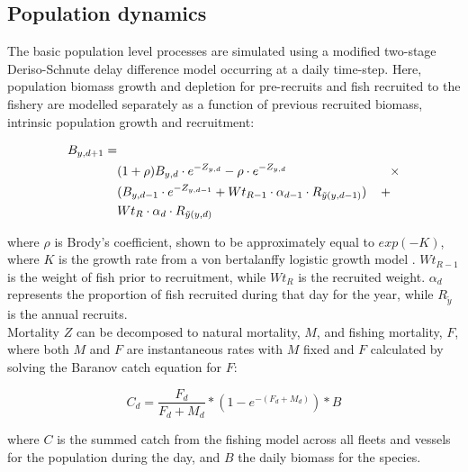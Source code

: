 \documentclass[review]{elsarticle}
\begin{document}
\subsection{Population dynamics}

The basic population level processes are simulated using a modified two-stage
Deriso-Schnute delay difference model \cite{Deriso1980, Schnute1985,
	Dichmont2003} occurring at a daily time-step. Here, population biomass
growth and depletion for pre-recruits and fish recruited to the fishery are
modelled separately as a function of previous recruited biomass, intrinsic
population growth and recruitment:

\begin{equation*}
	\begin{split}
	B_{y,d+1} = &\\
	& (1 + \rho) B_{y,d} \cdot e^{-Z_{y,d}} - \rho \cdot e^{-Z_{y,d}} \hspace{2.9cm}
	\times \\  
	& (B_{y,d-1} \cdot e^{-Z_{y,d-1}} + Wt_{R-1} \cdot \alpha_{d-1} \cdot R_{\tilde{y}(y,d-1)})
	\hspace{0.4cm} + \\
	& Wt_{R} \cdot \alpha_{d} \cdot R_{\tilde{y}(y,d)} 
	\end{split}
\end{equation*}

where $\rho$ is Brody's coefficient, shown to be approximately equal to
$exp(-K)$, where $K$ is the growth rate from a von bertalanffy logistic growth
model \cite{Schnute1985}. $Wt_{R-1}$ is the weight of fish prior to
recruitment, while $Wt_{R}$ is the recruited weight. $\alpha_{d}$ represents
the proportion of fish recruited during that day for the year, while
$R_{\tilde{y}}$ is the annual recruits. \\

Mortality $Z$ can be decomposed to natural mortality, $M$, and fishing
mortality, $F$, where both $M$ and $F$ are instantaneous rates with $M$ fixed
and $F$ calculated by solving the Baranov catch equation \cite{Hilborn1992b}
for $F$:

\begin{equation*}
C_{d} = \frac{F_{d}}{F_{d}+M_{d}} * (1 - e^{-(F_{d} + M_{d})}) * B
\end{equation*}

where $C$ is the summed catch from the fishing model across all fleets and
vessels for the population during the day, and $B$ the daily biomass for the
species. \\
\end{document}
